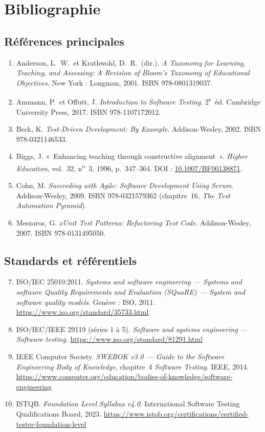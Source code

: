 \documentclass[11pt,a4paper]{article}
\begin{document}
\section{Bibliographie}

\subsection{Références principales}

\begin{enumerate}
    \item Anderson, L.~W.\ et Krathwohl, D.~R.\ (dir.). \emph{A Taxonomy for Learning, Teaching, and Assessing: A Revision of Bloom's Taxonomy of Educational Objectives}. New York : Longman, 2001. ISBN 978-0801319037.
    \item Ammann, P.\ et Offutt, J. \emph{Introduction to Software Testing}. 2\textsuperscript{e}~éd. Cambridge University Press, 2017. ISBN 978-1107172012.
    \item Beck, K. \emph{Test-Driven Development: By Example}. Addison-Wesley, 2002. ISBN 978-0321146533.
    \item Biggs, J. «~Enhancing teaching through constructive alignment~». \emph{Higher Education}, vol.~32, n\textsuperscript{o}~3, 1996, p.~347--364. DOI : \href{https://doi.org/10.1007/BF00138871}{10.1007/BF00138871}.
    \item Cohn, M. \emph{Succeeding with Agile: Software Development Using Scrum}. Addison-Wesley, 2009. ISBN 978-0321579362 (chapitre~16, \emph{The Test Automation Pyramid}).
    \item Meszaros, G. \emph{xUnit Test Patterns: Refactoring Test Code}. Addison-Wesley, 2007. ISBN 978-0131495050.
\end{enumerate}

\subsection{Standards et référentiels}

\begin{enumerate}\setcounter{enumi}{6}
    \item ISO/IEC 25010:2011. \emph{Systems and software engineering --- Systems and software Quality Requirements and Evaluation (SQuaRE) --- System and software quality models}. Genève : ISO, 2011. \url{https://www.iso.org/standard/35733.html}
    \item ISO/IEC/IEEE 29119 (séries 1 à 5). \emph{Software and systems engineering --- Software testing}. \url{https://www.iso.org/standard/81291.html}
    \item IEEE Computer Society. \emph{SWEBOK v3.0 --- Guide to the Software Engineering Body of Knowledge}, chapitre~4 \emph{Software Testing}. IEEE, 2014. \url{https://www.computer.org/education/bodies-of-knowledge/software-engineering}
    \item ISTQB. \emph{Foundation Level Syllabus v4.0}. International Software Testing Qualifications Board, 2023. \url{https://www.istqb.org/certifications/certified-tester-foundation-level}
\end{enumerate}
\end{document}

